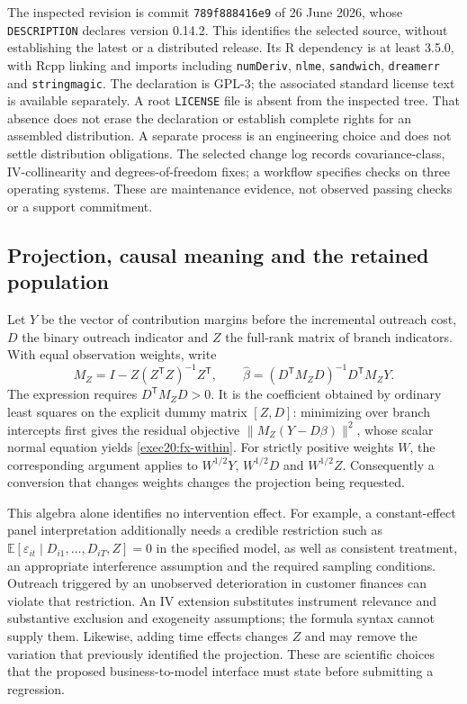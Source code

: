 The inspected revision is commit \texttt{789f888416e9} of 26 June 2026, whose
\texttt{DESCRIPTION} declares version 0.14.2. This identifies the selected source,
without establishing the latest or a distributed release. Its R dependency is
at least 3.5.0, with Rcpp linking and imports including \texttt{numDeriv},
\texttt{nlme}, \texttt{sandwich}, \texttt{dreamerr} and \texttt{stringmagic}.
The declaration is GPL-3; the associated standard license text is available
separately. A root \texttt{LICENSE} file is absent from the inspected tree.
That absence does not erase the declaration or establish complete rights for
an assembled distribution. A separate process is an engineering choice and
does not settle distribution obligations. The selected change log records
covariance-class, IV-collinearity and degrees-of-freedom fixes; a workflow
specifies checks on three operating systems. These are maintenance evidence,
not observed passing checks or a support commitment.~\citep{exec20_fixest_source}

\subsection{Projection, causal meaning and the retained population}
\label{exec20:fx-projection}
Let $Y$ be the vector of contribution margins before the incremental outreach
cost, $D$ the binary outreach indicator and $Z$ the full-rank matrix of branch
indicators. With equal observation weights, write
\begin{equation}
 M_Z=I-Z(Z^{\mathsf T}Z)^{-1}Z^{\mathsf T},\qquad
 \widehat\beta=(D^{\mathsf T}M_ZD)^{-1}D^{\mathsf T}M_ZY.
 \label{exec20:fx-within}
\end{equation}
The expression requires $D^{\mathsf T}M_ZD>0$. It is the coefficient obtained
by ordinary least squares on the explicit dummy matrix $[Z,D]$: minimizing
over branch intercepts first gives the residual objective
$\|M_Z(Y-D\beta)\|^2$, whose scalar normal equation yields
\eqref{exec20:fx-within}. For strictly positive weights $W$, the corresponding
argument applies to $W^{1/2}Y$, $W^{1/2}D$ and $W^{1/2}Z$. Consequently a
conversion that changes weights changes the projection being requested.

This algebra alone identifies no intervention effect. For example, a
constant-effect panel interpretation additionally needs a credible restriction
such as $\mathbb E[\varepsilon_{it}\mid D_{i1},\ldots,D_{iT},Z]=0$ in the
specified model, as well as consistent treatment, an appropriate interference
assumption and the required sampling conditions. Outreach triggered by an
unobserved deterioration in customer finances can violate that restriction.
An IV extension substitutes instrument relevance and substantive exclusion
and exogeneity assumptions; the formula syntax cannot supply them. Likewise,
adding time effects changes $Z$ and may remove the variation that previously
identified the projection. These are scientific choices that the proposed
business-to-model interface must state before submitting a regression.

